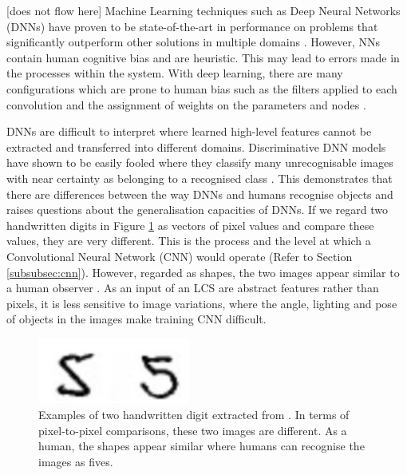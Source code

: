 [does not flow here]
 Machine Learning techniques such as Deep Neural Networks (DNNs) have proven to be state-of-the-art in performance on problems that significantly outperform other solutions in multiple domains \cite{lecun2015deep}. However, NNs contain human cognitive bias and are heuristic. This may lead to errors made in the processes within the system. With deep learning, there are many configurations which are prone to human bias such as the filters applied to each convolution and the assignment of weights on the parameters and nodes \cite{Cognitiv47}.

DNNs are difficult to interpret where learned high-level features cannot be extracted and transferred into different domains. Discriminative DNN models have shown to be easily fooled where they classify many unrecognisable images with near certainty as belonging to a recognised class \cite{nguyen2015deep}. This demonstrates that there are differences between the way DNNs and humans recognise objects and raises questions about the generalisation capacities of DNNs. If we regard two handwritten digits in Figure \ref{fig:similar5} as vectors of pixel values and compare these values, they are very different. This is the process and the level at which a Convolutional Neural Network (CNN) would operate (Refer to Section \ref{subsubsec:cnn}). However, regarded as shapes, the two images appear similar to a human observer \cite{belongie2002shape}. As an input of an LCS are abstract features rather than pixels, it is less sensitive to image variations, where the angle, lighting and pose of objects in the images make training CNN difficult. 

\begin{figure}[H]
	\begin{center}
		\includegraphics[width=50mm, scale=0.5]{similar5.png}
		\caption{Examples of two handwritten digit extracted from \cite{mnist}. In terms of pixel-to-pixel comparisons, these two images are different. As a human, the shapes appear similar where humans can recognise the images as fives.}
		\label{fig:similar5}
	\end{center}
\end{figure} 

